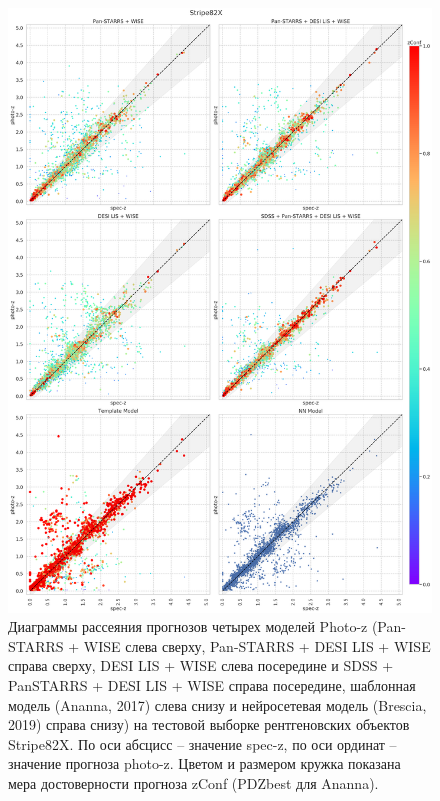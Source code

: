 \documentclass[fleqn,usenatbib]{mnras}
\begin{document}
\begin{figure}[ht]
    \centering
    \includegraphics[width=0.9\linewidth]{images/scatterplots-stripe82x.png}
    \caption{Диаграммы рассеяния прогнозов четырех моделей Photo-z (Pan-STARRS + WISE слева сверху, Pan-STARRS + DESI LIS + WISE справа сверху, DESI LIS + WISE слева посередине и SDSS + PanSTARRS + DESI LIS + WISE справа посередине, шаблонная модель (Ananna, 2017) слева снизу и нейросетевая модель (Brescia, 2019) справа снизу) на тестовой выборке рентгеновских объектов Stripe82X. По оси абсцисс -- значение spec-z, по оси ординат -- значение прогноза photo-z. Цветом и размером кружка показана мера достоверности прогноза zConf (PDZbest для Ananna).}
    \label{fig:s82x}
\end{figure}
\end{document}
